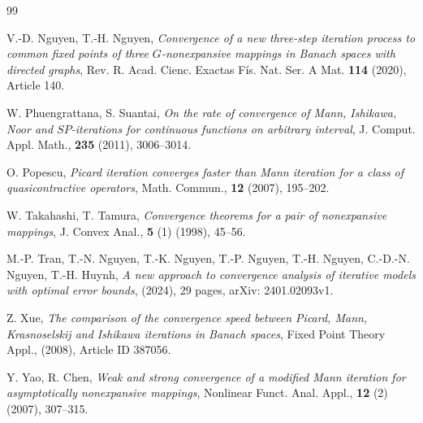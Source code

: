 \documentclass[a4paper, 11pt]{article}
\begin{document}
\begin{thebibliography}{99}

 V.-D. Nguyen, T.-H. Nguyen, {\em Convergence of a new three-step iteration process to common fixed points of three $G$-nonexpansive mappings in Banach spaces with directed graphs}, Rev. R. Acad. Cienc. Exactas Fís. Nat. Ser. A Mat. {\bf 114} (2020), Article 140.

 W. Phuengrattana, S. Suantai, {\em On the rate of convergence of Mann, Ishikawa, Noor and $SP$-iterations for continuous functions on arbitrary interval}, J. Comput. Appl. Math., {\bf 235} (2011), 3006--3014.

 O. Popescu, {\em Picard iteration converges faster than Mann iteration for a class of quasicontractive operators}, Math. Commun., {\bf 12} (2007), 195--202.




  W. Takahashi, T. Tamura, {\em Convergence theorems for a pair of nonexpansive mappings}, J. Convex Anal., {\bf 5} (1) (1998), 45--56.

 M.-P. Tran, T.-N. Nguyen, T.-K. Nguyen, T.-P. Nguyen, T.-H. Nguyen, C.-D.-N. Nguyen, T.-H. Huynh, {\em A new approach to convergence analysis of iterative models with optimal error bounds}, (2024), 29 pages, arXiv: 2401.02093v1.

 Z. Xue, {\em The comparison of the convergence speed between Picard, Mann, Krasnoselskij and Ishikawa iterations in Banach spaces}, Fixed Point Theory Appl., (2008), Article ID 387056.

 Y. Yao, R. Chen, {\em Weak and strong convergence of a modified Mann iteration for asymptotically nonexpansive mappings}, Nonlinear Funct. Anal. Appl., {\bf 12} (2) (2007), 307--315.

\end{thebibliography}
\end{document}
